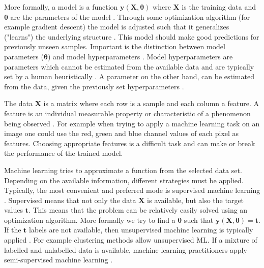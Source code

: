 \documentclass[draft,final,oneside]{vutinfth} %
\begin{document}
More formally, a model is a function $\boldsymbol{y}(\boldsymbol{X}, \boldsymbol{\theta})$ where $\boldsymbol{X}$ is the training data and $\boldsymbol{\theta}$ are the parameters of the model \cite{bishop}. Through some optimization algorithm (for example gradient descent) the model is adjusted such that it generalizes ("learns") the underlying structure \cite{anintroductiontoneuralnetworks}. This model should make good predictions for previously unseen samples. Important is the distinction between model parameters ($\boldsymbol{\theta}$) and model hyperparameters \cite{aimodern}. Model hyperparameters are parameters which cannot be estimated from the available data and are typically set by a human heuristically \cite{hyperparameter}. A parameter on the other hand, can be estimated from the data, given the previously set hyperparameters \cite{anintroductiontoneuralnetworks}.

The data $\boldsymbol{X}$ is a matrix where each row is a sample and each column a feature. A feature is an individual measurable property or characteristic of a phenomenon being observed \cite{bishop}. For example when trying to apply a machine learning task on an image one could use the red, green and blue channel values of each pixel as features. Choosing appropriate features is a difficult task and can make or break the performance of the trained model.

Machine learning tries to approximate a function from the selected data set. Depending on the available information, different strategies must be applied. Typically, the most convenient and preferred mode is supervised machine learning \cite{aimodern}. Supervised means that not only the data $\boldsymbol{X}$ is available, but also the target values $\boldsymbol{t}$. This means that the problem can be relatively easily solved using an optimization algorithm. More formally we try to find a $\boldsymbol{\theta}$ such that $\boldsymbol{y}(\boldsymbol{X}, \boldsymbol{\theta}) = \boldsymbol{t}$. If the $\boldsymbol{t}$ labels are not available, then unsupervised machine learning is typically applied \cite{aimodern}. For example clustering methods allow unsupervised ML. If a mixture of labelled and unlabelled data is available, machine learning practitioners apply semi-supervised machine learning \cite{semisupervised}.
\end{document}
